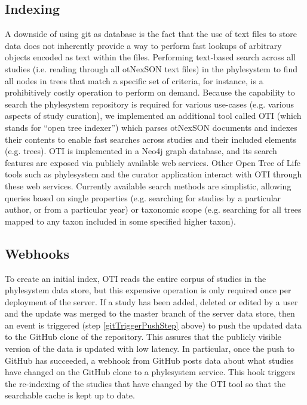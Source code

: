 \documentclass{bioinfo}
\newcommand{\ps}{phylesystem\xspace}
\newcommand{\otol}{Open Tree of Life\xspace}
\newcommand{\nexson}{otNexSON\xspace}
\begin{document}
\begin{methods}
\subsection*{Indexing}
A downside of using git as database is the fact that the use of text files to store data does not inherently
    provide a way to perform fast lookups of arbitrary objects encoded as text within the files.
Performing text-based search across all studies (i.e. reading through all \nexson text files) in the \ps to find all nodes
    in trees that match a specific set of criteria, for instance, is a prohibitively costly operation to perform on demand.
Because the capability to search the \ps repository is required for various use-cases (e.g. various aspects of
    study curation), we implemented an additional tool called OTI (which stands for ``open tree indexer'') which parses \nexson
    documents and indexes their contents to enable fast searches across studies and their included elements (e.g. trees).
OTI is implemented in a Neo4j graph database, and its search features are exposed via publicly available web services.
Other \otol tools such as \ps and the curator application interact with OTI through these web services.
Currently available search methods are simplistic, allowing queries based on single properties (e.g. searching for studies
    by a particular author, or from a particular year) or taxonomic scope (e.g. searching for all trees mapped to
    any taxon included in some specified higher taxon).


\subsection*{Webhooks}
To create an initial index, OTI reads the entire corpus of studies in the \ps data store, but this expensive operation
    is only required once per deployment of the server.
If a study has been added, deleted or edited by a user and the update was merged to the master branch of the server data store,
    then an event is triggered (step \ref{gitTriggerPushStep} above) to push the updated data to the GitHub clone
    of the repository.
This assures that the publicly visible version of the data is updated
    with low latency.
In particular, once the push to GitHub has succeeded, a webhook from GitHub posts data about what studies have changed
    on the GitHub clone to a \ps service.
This hook triggers the re-indexing of the studies that have changed by the OTI tool so that the searchable cache is
    kept up to date.


\end{methods}
\end{document}
